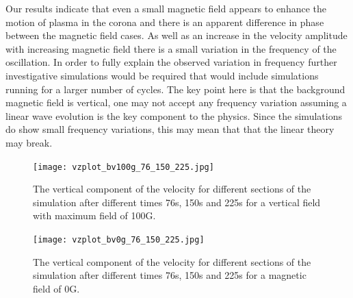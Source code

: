 \documentclass[physics,article,submit,pdftex,moreauthors]{Definitions/mdpi}
\begin{document}
  Our results indicate that even a small magnetic field appears to enhance the motion of plasma in the corona and  there is an apparent difference in phase between the magnetic field cases. As well as an increase in the velocity amplitude with increasing magnetic field there is a small variation in the frequency of the oscillation. In order to fully explain the observed variation in frequency further investigative simulations would be required  that would include simulations running for a larger number of cycles.  The key point here is that the background magnetic field is vertical, one may not accept any frequency variation assuming a linear wave evolution is the key component to the physics. Since the simulations do show small frequency variations, this may mean that that the linear theory may break.
  
\begin{figure}\label{vzplot_bv100g_76_150_225}
\texttt{[image: vzplot\_bv100g\_76\_150\_225.jpg]}
\caption{The vertical component of the velocity for different sections of the simulation after different times 76s, 150s and 225s for a vertical field with maximum field of 100G.}
\end{figure}



\begin{figure}\label{vzplot_bv0g_76_150_225}
\texttt{[image: vzplot\_bv0g\_76\_150\_225.jpg]}
\caption{The vertical component of the velocity for different sections of the simulation after different times 76s, 150s and 225s for a magnetic field of 0G.}
\end{figure}



\end{document}
